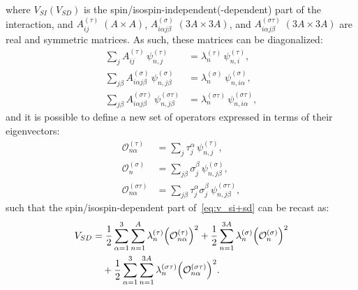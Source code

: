\documentclass[aps,prc,twocolumn,superscriptaddress,showpacs,floatfix,nofootinbib]{revtex4-1}
\begin{document}
where $V_{SI}(V_{SD})$ is the spin/isospin-independent(-dependent) part of the interaction, 
and $A^{(\tau)}_{ij}\;(A\times A)$, $A^{(\sigma)}_{i\alpha j\beta}\;(3A\times 3A)$, 
and $A^{(\sigma\tau)}_{i\alpha j\beta}\;(3A\times 3A)$
are real and symmetric matrices.
As such, these matrices can be diagonalized:
\begin{align}
\sum_{j}A^{(\tau)}_{ij}\,\psi_{n,j}^{(\tau)}&=\lambda_n^{(\tau)}\,\psi_{n,i}^{(\tau)} , \nonumber \\
\sum_{j\beta}A^{(\sigma)}_{i\alpha j\beta}\,\psi_{n,j\beta}^{(\sigma)}&=\lambda_n^{(\sigma)}\,\psi_{n,i\alpha}^{(\sigma)} , \nonumber \\
\sum_{j\beta}A^{(\sigma\tau)}_{i\alpha j\beta}\,\psi_{n,j\beta}^{(\sigma\tau)}&=\lambda_n^{(\sigma\tau)}\,\psi_{n,i\alpha}^{(\sigma\tau)} , \nonumber
\end{align}
and it is possible to define a new set of operators expressed in terms of their eigenvectors: 
\begin{align}
\mathcal O_{n\alpha}^{(\tau)}&=\sum_{j}\tau_j^\alpha\,\psi_{n,j}^{(\tau)} , \nonumber \\
\mathcal O_{n}^{(\sigma)}&=\sum_{j\beta}\sigma_j^\beta\,\psi_{n,j\beta}^{(\sigma)} , \nonumber \\
\mathcal O_{n\alpha}^{(\sigma\tau)}&=\sum_{j\beta}\tau_j^\alpha\sigma_j^\beta\,\psi_{n,j\beta}^{(\sigma\tau)} , \nonumber 
\end{align}
such that the spin/isospin-dependent part of~\cref{eq:v_si+sd} can be recast as:
\begin{align}
V_{SD}&= 
 {1\over2}\sum_{\alpha=1}^3\sum_{n=1}^{A} \lambda_n^{(\tau)}\Big(\mathcal O_{n\alpha}^{(\tau)}\Big)^2
+{1\over2}\sum_{n=1}^{3A} \lambda_n^{(\sigma)}\Big(\mathcal O_n^{(\sigma)}\Big)^2 \nonumber \\
&\quad+{1\over2}\sum_{\alpha=1}^3\sum_{n=1}^{3A} \lambda_n^{(\sigma\tau)}\Big(\mathcal O_{n\alpha}^{(\sigma\tau)}\Big)^2 .
\end{align}
\end{document}
